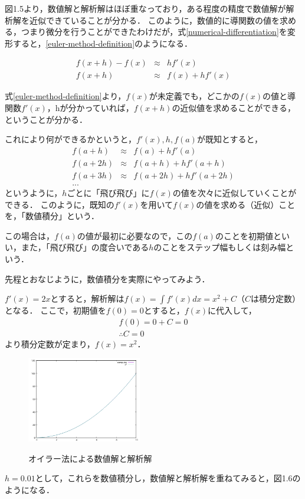 図1.5より，数値解と解析解はほぼ重なっており，ある程度の精度で数値解が解析解を近似できていることが分かる．
このように，数値的に導関数の値を求める，つまり微分を行うことができたわけだが，式\ref{numerical-differentiation}を変形すると，\ref{euler-method-definition}のようになる．

\begin{eqnarray}
f(x+h)-f(x) &\approx& h f'(x) \\
f(x+h) &\approx& f(x) + h f'(x)
\label{euler-method-definition}
\end{eqnarray}

式\ref{euler-method-definition}より，$f(x)$が未定義でも，どこかの$f(x)$の値と導関数$f'(x)$，hが分かっていれば，$f(x+h)$の近似値を求めることができる，ということが分かる．

これにより何ができるかというと，$f'(x),h,f(a)$が既知とすると，
\begin{eqnarray}
f(a+h)  &\approx& f(a) + h f'(a) \\
f(a+2h) &\approx& f(a+h) + h f'(a+h) \\
f(a+3h) &\approx& f(a+2h) + h f'(a+2h) \\
...
\end{eqnarray}
というように，$h$ごとに「飛び飛び」に$f(x)$の値を次々に近似していくことができる．
このように，既知の$f'(x)$を用いて$f(x)$の値を求める（近似）ことを，「数値積分」という．

この場合は，$f(a)$の値が最初に必要なので，この$f(a)$のことを初期値といい，また，「飛び飛び」の度合いである$h$のことをステップ幅もしくは刻み幅という．


先程とおなじように，数値積分を実際にやってみよう．


$f'(x)=2x$とすると，解析解は$f(x)=\int f'(x) dx = x^2 + C$（$C$は積分定数）となる．
ここで，初期値を$f(0)=0$とすると，$f(x)$に代入して，
\begin{eqnarray}
f(0) = 0 + C = 0 \\
\therefore C = 0
\end{eqnarray}
より積分定数が定まり，$f(x) = x^2$．

\begin{figure}
\centering
\includegraphics[width=5cm]{euler-method.png}
\label{euler-method-graph}
\caption{オイラー法による数値解と解析解}
\end{figure}
$h=0.01$として，これらを数値積分し，数値解と解析解を重ねてみると，図1.6のようになる．

